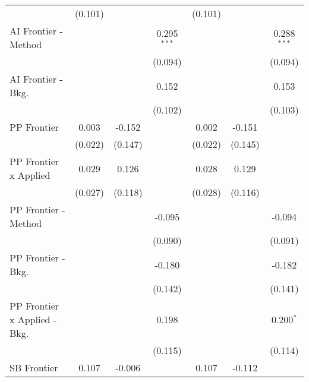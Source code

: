 \begin{tabular}{lcccccc}
                                & (0.101)       &              &               & (0.101)       &              &   \\   
   AI Frontier - Method         &               &              & 0.295$^{***}$ &               &              & 0.288$^{***}$\\   
                                &               &              & (0.094)       &               &              & (0.094)\\   
   AI Frontier - Bkg.           &               &              & 0.152         &               &              & 0.153\\   
                                &               &              & (0.102)       &               &              & (0.103)\\   
   PP Frontier                  & 0.003         & -0.152       &               & 0.002         & -0.151       &   \\   
                                & (0.022)       & (0.147)      &               & (0.022)       & (0.145)      &   \\   
   PP Frontier x Applied        & 0.029         & 0.126        &               & 0.028         & 0.129        &   \\   
                                & (0.027)       & (0.118)      &               & (0.028)       & (0.116)      &   \\   
   PP Frontier - Method         &               &              & -0.095        &               &              & -0.094\\   
                                &               &              & (0.090)       &               &              & (0.091)\\   
   PP Frontier - Bkg.           &               &              & -0.180        &               &              & -0.182\\   
                                &               &              & (0.142)       &               &              & (0.141)\\   
   PP Frontier x Applied - Bkg. &               &              & 0.198         &               &              & 0.200$^{*}$\\   
                                &               &              & (0.115)       &               &              & (0.114)\\   
   SB Frontier                  & 0.107         & -0.006       &               & 0.107         & -0.112       &   \\   

\end{tabular}
